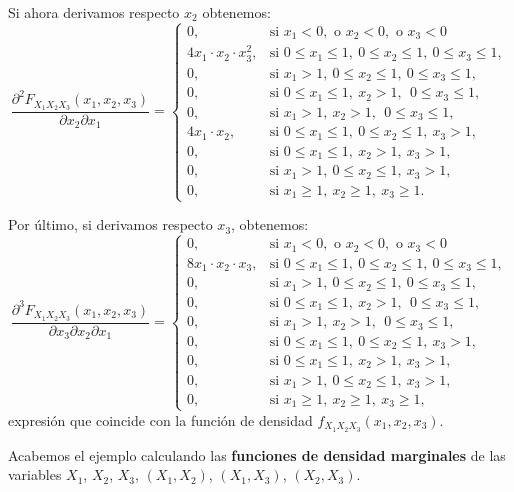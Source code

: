 \documentclass[]{book}
\begin{document}
Si ahora derivamos respecto \(x_2\) obtenemos:
\[
\frac{\partial^2 F_{X_1X_2X_3}(x_1,x_2,x_3)}{\partial x_2\partial x_1}=\begin{cases}
0, & \mbox{si }x_1<0,\mbox{ o }x_2<0,\mbox{ o }x_3 <0\\
4 x_1\cdot x_2\cdot x_3^2, & \mbox{si }0\leq x_1\leq 1,\ 0\leq x_2\leq 1,\ 0\leq x_3\leq 1, \\
 0, & \mbox{si }x_1> 1,\ 0\leq x_2\leq  1,\ 0\leq x_3\leq  1, \\
 0, & \mbox{si }0\leq x_1\leq  1,\ x_2> 1,\ \ 0\leq x_3\leq  1, \\
 0, & \mbox{si }x_1> 1,\ x_2> 1,\ \ 0\leq x_3\leq  1, \\
 4 x_1\cdot x_2, & \mbox{si }0\leq x_1\leq  1,\ 0\leq x_2\leq  1,\ x_3> 1,\\
 0, & \mbox{si }0\leq x_1\leq  1,\ x_2 >  1,\ x_3> 1,\\
 0, & \mbox{si }x_1>1,\ 0\leq x_2\leq  1,\ x_3> 1,\\
0, & \mbox{si }x_1\geq 1,\ x_2\geq 1,\ x_3\geq 1.
\end{cases}
\]

Por último, si derivamos respecto \(x_3\), obtenemos:
\[
\frac{\partial^3 F_{X_1X_2X_3}(x_1,x_2,x_3)}{\partial x_3\partial x_2\partial x_1}=\begin{cases}
0, & \mbox{si }x_1<0,\mbox{ o }x_2<0,\mbox{ o }x_3 <0\\
8 x_1\cdot x_2\cdot x_3, & \mbox{si }0\leq x_1\leq 1,\ 0\leq x_2\leq 1,\ 0\leq x_3\leq 1, \\
 0, & \mbox{si }x_1> 1,\ 0\leq x_2\leq  1,\ 0\leq x_3\leq  1, \\
 0, & \mbox{si }0\leq x_1\leq  1,\ x_2> 1,\ \ 0\leq x_3\leq  1, \\
 0, & \mbox{si }x_1> 1,\ x_2> 1,\ \ 0\leq x_3\leq  1, \\
 0, & \mbox{si }0\leq x_1\leq  1,\ 0\leq x_2\leq  1,\ x_3> 1,\\
 0, & \mbox{si }0\leq x_1\leq  1,\ x_2 >  1,\ x_3> 1,\\
 0, & \mbox{si }x_1>1,\ 0\leq x_2\leq  1,\ x_3> 1,\\
0, & \mbox{si }x_1\geq 1,\ x_2\geq 1,\ x_3\geq 1,
\end{cases}
\]
expresión que coincide con la función de densidad \(f_{X_1X_2X_3}(x_1,x_2,x_3)\).

Acabemos el ejemplo calculando las \textbf{funciones de densidad marginales} de las variables \(X_1\), \(X_2\), \(X_3\), \((X_1,X_2)\), \((X_1,X_3)\), \((X_2,X_3)\).
\end{document}
